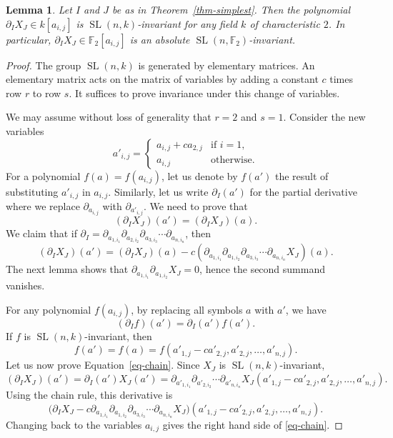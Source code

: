 \documentclass[10pt]{article}
\newtheorem{lemma}[theorem]{Lemma}
\theoremstyle{definition}
\newcommand{\FF}{{\mathbb{F}}}
\newcommand{\SL}{{\operatorname{SL}}}
\renewcommand{\a}[1]{a_{#1}}
\newcommand{\ap}[1]{a'_{#1}}
\begin{document}
\begin{lemma} \label{lem-invariance}
Let $I$ and $J$ be as in Theorem~\ref{thm-simplest}. Then the polynomial $\partial_I X_J \in k[\a{i, j}]$ is $\SL(n,k)$-invariant for any field $k$ of characteristic $2$. In particular, $\partial_I X_J \in \FF_2[\a{i, j}]$ is an absolute $\SL(n, \FF_2)$-invariant.
\end{lemma}

\begin{proof}
The group $\SL(n,k)$ is generated by elementary matrices. An elementary matrix acts on the matrix of variables by adding a constant $c$ times row $r$ to row $s$. It suffices to prove invariance under this change of variables. 

We may assume without loss of generality that $r=2$ and $s=1$. Consider the new variables
\[ a'_{i,j} = \begin{cases} 
\a{i, j} + c \a{2, j} & \text{if $i=1$,} \\ 
\a{i, j} & \text{otherwise.}
\end{cases}
\]
For a polynomial $f(a) = f(\a{i, j})$,  let us denote by $f(a')$ the result of substituting $\ap{i,j}$ in $\a{i, j}$. Similarly, let us write $\partial_I(a')$ for the partial derivative where we replace $\partial_{\a{i, j}}$ with $\partial_{a'_{i,j}}$. We need to prove that 
\[ (\partial_I X_J)(a') = (\partial_I X_J) (a). \]
We claim that if $\partial_I = \partial_{\a{1, i_1}}  \partial_{\a{2, i_2}} \partial_{\a{3, i_3}}\cdots \partial_{\a{n, i_n}}$, then 
\begin{equation} (\partial_I X_J)(a') = (\partial_I X_J)(a) - c (\partial_{\a{1, i_1}}  \partial_{\a{1, i_2}} \partial_{\a{3, i_3}} \cdots \partial_{\a{n, i_n}} X_J)(a). \label{eq-chain} \end{equation}
The next lemma shows that $\partial_{\a{1, i_1}}  \partial_{\a{1, i_2}} X_J = 0$, hence the second summand vanishes.

For any polynomial $f(\a{i, j})$, by replacing all symbols $a$ with $a'$, we have  
\[ (\partial_I f)(a')= \partial_I(a') f(a').\]
If $f$ is $\SL(n,k)$-invariant, then 
\[ f(a') = f(a) = f(a'_{1,j} - c a'_{2,j}, a'_{2,j},\ldots, a'_{n,j}).\] 
Let us now prove Equation~\eqref{eq-chain}. Since $X_J$ is $\SL(n,k)$-invariant, 
\[  (\partial_I X_J)(a') = \partial_I(a') X_J(a') = \partial_{\ap{1, i_1}}  \partial_{\ap{2, i_2}} \cdots \partial_{\ap{n, i_n}} X_J (a'_{1,j} - c a'_{2,j}, a'_{2,j},\ldots, a'_{n,j}).\]
Using the chain rule, this derivative is
\[ \big( \partial_I X_J - c \partial_{\a{1, i_1}}  \partial_{\a{1, i_2}}\partial_{\a{3, i_3}} \cdots \partial_{\a{n, i_n}} X_J \big) (a'_{1,j} - c a'_{2,j}, a'_{2,j},\ldots, a'_{n,j}).\]
Changing back to the variables $\a{i,j}$ gives the right hand side of  \eqref{eq-chain}.
\end{proof}
\end{document}
